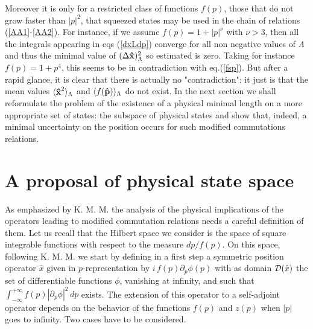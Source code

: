 \documentclass[a4paper,10pt]{article}
\newcommand{\x}{\mbox{\rm{\bf \^ x}}}
\newcommand{\p}{\mbox{\rm{\bf \^ p}}}
\newcommand{\cD}{{\cal D}}
\newcommand{\xp}{i\,f(p)\partial_p}
\newcommand{\KMM}{K. M. M. }
\begin{document}
Moreover it is only for a restricted class of functions $f(p)$,
those that do not grow faster than $\vert p\vert^{2}$, that
squeezed states may be used in the chain of relations
(\ref{AA1}-\ref{AA2}). For instance, if we assume $f(p)=1+|p|^\nu$
with $\nu>3$, then all the integrals appearing in eqs
(\ref{dxLdp}) converge for all non negative values of $\Lambda$
and thus the minimal value of $ (\Delta \x)^2_{\Lambda}$ so
estimated is zero. Taking for instance $f(p)=1+p^4$, this seems to
be in contradiction with eq.(\ref{fsp}). But after a rapid glance,
it is clear that there is actually no "contradiction": it just is
that the mean values $\langle\x^2\rangle_\Lambda$ and $\langle
f(\p)\rangle_\Lambda$ do not exist. In the next section we shall
reformulate the problem of the existence of a physical minimal
length on a more appropriate set of states: the subspace of
physical states and show that, indeed, a minimal uncertainty on
the position occurs for such modified commutations relations.
\section{A proposal of physical state space}
As emphasized by \KMM the analysis of the physical implications of
the operators leading to modified commutation relations needs a
careful definition of them. Let us recall that the Hilbert space
we consider is the space of square integrable functions with
respect to the measure $dp/f(p)$. On this space, following \KMM we
start by defining in a first step a symmetric position operator
$\hat x$ given in $p$-representation by $\xp\phi(p)$ with as
domain $\cD({\hat x})$ the set of differentiable functions $\phi$,
vanishing at infinity, and such that
$\int_{-\infty}^{+\infty}f(p)|\partial_p \phi|^2\,dp$ exists. The
extension of this operator to a self-adjoint operator depends on
the behavior of the functions $f(p)$ and $z(p)$ when $\vert
p\vert$ goes to infinity. Two cases have to be considered.
\end{document}
